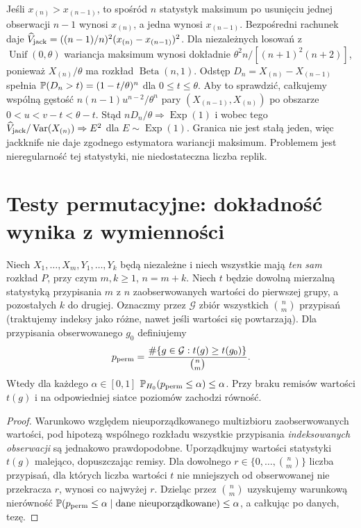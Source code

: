 \begin{przyklad}
Jeśli $x_{(n)}>x_{(n-1)}$, to spośród $n$ statystyk
maksimum po usunięciu jednej obserwacji $n-1$ wynosi
$x_{(n)}$, a jedna wynosi $x_{(n-1)}$.
Bezpośredni rachunek daje
$\widehat V_{\rm jack}=((n-1)/n)^2
(x_{(n)}-x_{(n-1)})^2$.
Dla niezależnych losowań z $\operatorname{Unif}(0,\theta)$
wariancja maksimum wynosi dokładnie
$\theta^2 n/[(n+1)^2(n+2)]$, ponieważ
$X_{(n)}/\theta$ ma rozkład $\operatorname{Beta}(n,1)$.
Odstęp $D_n=X_{(n)}-X_{(n-1)}$ spełnia
$\mathbb P(D_n>t)=(1-t/\theta)^n$ dla $0\le t\le\theta$.
Aby to sprawdzić, całkujemy wspólną gęstość
$n(n-1)u^{n-2}/\theta^n$ pary
$(X_{(n-1)},X_{(n)})$ po obszarze
$0<u<v-t<\theta-t$.
Stąd $nD_n/\theta\Rightarrow\operatorname{Exp}(1)$
i wobec tego
$\widehat V_{\rm jack}/\operatorname{Var}(X_{(n)})
\Rightarrow E^2$ dla $E\sim\operatorname{Exp}(1)$.
Granica nie jest stałą jeden, więc jackknife nie daje
zgodnego estymatora wariancji maksimum. Problemem jest
nieregularność tej statystyki, nie niedostateczna liczba
replik.
\end{przyklad}

\section{Testy permutacyjne: dokładność wynika z wymienności}
\begin{twierdzenie}
\label{thm:permutation-exact}
Niech $X_1,\ldots,X_m,Y_1,\ldots,Y_k$ będą niezależne
i niech wszystkie mają \emph{ten sam} rozkład $P$,
przy czym $m,k\ge1$, $n=m+k$.
Niech $t$ będzie dowolną mierzalną statystyką przypisania
$m$ z $n$ zaobserwowanych wartości do pierwszej grupy,
a pozostałych $k$ do drugiej. Oznaczmy przez $\mathcal G$
zbiór wszystkich $\binom nm$ przypisań (traktujemy indeksy
jako różne, nawet jeśli wartości się powtarzają).
Dla przypisania obserwowanego $g_0$ definiujemy
\[
 p_{\rm perm}=
 \frac{\#\{g\in\mathcal G:t(g)\ge t(g_0)\}}{\binom nm}.
\]
Wtedy dla każdego $\alpha\in[0,1]$
$\mathbb P_{H_0}(p_{\rm perm}\le\alpha)\le\alpha$.
Przy braku remisów wartości $t(g)$ i na odpowiedniej
siatce poziomów zachodzi równość.
\end{twierdzenie}
\begin{proof}
Warunkowo względem nieuporządkowanego multizbioru
zaobserwowanych wartości, pod hipotezą wspólnego rozkładu
wszystkie przypisania \emph{indeksowanych obserwacji}
są jednakowo prawdopodobne. Uporządkujmy wartości statystyki
$t(g)$ malejąco, dopuszczając remisy. Dla dowolnego
$r\in\{0,\ldots,\binom nm\}$ liczba przypisań,
dla których liczba wartości $t$ nie mniejszych od obserwowanej
nie przekracza $r$, wynosi co najwyżej $r$.
Dzieląc przez $\binom nm$ uzyskujemy warunkową nierówność
$\mathbb P(p_{\rm perm}\le\alpha\mid\text{dane nieuporządkowane})
\le\alpha$, a całkując po danych, tezę.
\end{proof}

